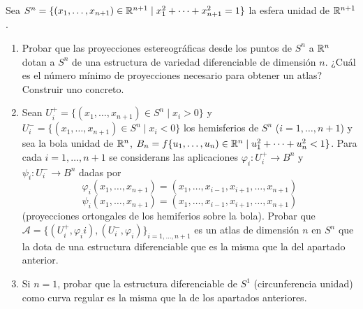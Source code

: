 \documentclass[twoside]{article}
\begin{document}
\begin{ejercicio}{2}
Sea $S^n = \{(x_1,\dots, x_{n+1})\in \mathbb{R}^{n+1}\mid x^2_1
+\cdots+x^2_{n+1} = 1\}$ la esfera
unidad de $\mathbb{R}^{n+1}$.\
\begin{enumerate}
\item Probar que las proyecciones estereográficas desde los puntos de $S^n$ a $\mathbb{R}^n$
dotan a $S^n$ de una estructura de variedad diferenciable de dimensión $n$.
¿Cuál es el número mínimo de proyecciones necesario para obtener un atlas?
Construir uno concreto.
\item Sean $U^+_i = \{(x_1, \dots, x_{n+1}) \in S^n\mid x_i > 0\}$ y $U^-_i = \{(x_1, \dots, x_{n+1}) \in S^n\mid x_i <
0\}$ los hemisferios de $S^n$ ($i = 1,\dots, n + 1$) y sea la bola unidad de $\mathbb{R}^n$,
$B_n = f\{u_1,\dots, u_n) \in \mathbb{R}^n\mid u^2_1
+ \cdots + u^2_n < 1\}$. Para cada $i = 1, \dots, n + 1$ se considerans las aplicaciones $φ_i : U_i^+ \to B^n$ y $ψ_i : U_i^- \to B^n$ dadas por
\[ φ_i(x_1,\dots,x_{n+1}) = (x_1,\dots,x_{i-1},x_{i+1},\dots,x_{n+1}) \]
\[ ψ_i(x_1,\dots,x_{n+1}) = (x_1,\dots,x_{i-1},x_{i+1},\dots,x_{n+1}) \]
(proyecciones ortongales de los hemiferios sobre la bola). Probar que $\mathcal{A} = \{(U_i^+,φ_ii),(U_i^-,φ_i)\}_{i=1,\dots,n+1}$ es un atlas de dimensión $n$ en $S^n$ que la dota de una estructura diferenciable que es la misma que la del apartado anterior.
\item Si $n=1$, probar que la estructura diferenciable de $S^1$ (circunferencia unidad) como curva regular es la misma que la de los apartados anteriores.
\end{enumerate}
\end{ejercicio}
\end{document}
